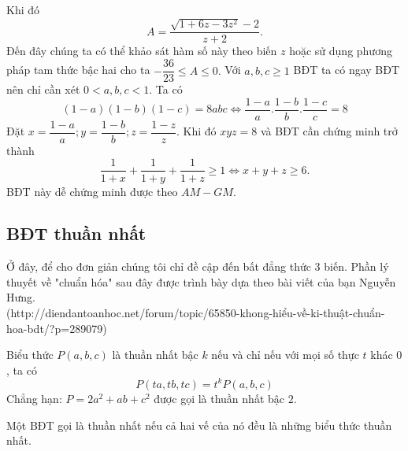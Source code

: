 Khi đó \[A=\frac{\sqrt{1+6z-3{{z}^{2}}}-2}{z+2}.\] Đến đây chúng ta có thể khảo sát hàm số này theo biến $z$ hoặc sử dụng phương pháp tam thức bậc hai cho ta $-\dfrac{36}{23}\le A\le 0.$
\hda  Với $a,b,c\ge 1$ BĐT ta có ngay BĐT nên chỉ cần xét $0<a,b,c<1$.
Ta có \[\left( 1-a \right)\left( 1-b \right)\left( 1-c \right)=8abc\Leftrightarrow \frac{1-a}{a}.\frac{1-b}{b}.\frac{1-c}{c}=8\]
Đặt $x=\dfrac{1-a}{a};y=\dfrac{1-b}{b};z=\dfrac{1-z}{z}$. Khi đó $xyz=8$ và BĐT cần chứng minh trở thành
\[\frac{1}{1+x}+\frac{1}{1+y}+\frac{1}{1+z}\ge 1\Leftrightarrow x+y+z\ge 6.\] BĐT này dễ chứng minh được theo $AM-GM$.
\subsection{BĐT thuần nhất}
Ở đây, để cho đơn giản chúng tôi chỉ đề cập đến bất đẳng thức 3 biến. Phần lý thuyết về "chuẩn hóa" sau đây được trình bày dựa theo bài viết của bạn Nguyễn Hưng.\\(http://diendantoanhoc.net/forum/topic/65850-khong-hiểu-về-ki-thuật-chuẩn-hoa-bdt/?p=289079)

Biểu thức $P(a,b,c)$ là thuần nhất bậc $k$ nếu và chỉ nếu với mọi số thực $t$ khác $0$, ta có
\[P\left( {ta,tb,tc} \right)={t^k}P\left( {a,b,c} \right)\]
Chẳng hạn: $P=2a^2+ab+c^2$ được gọi là thuần nhất bậc $2$.

Một BĐT gọi là thuần nhất nếu cả hai vế của nó đều là những biểu thức thuần nhất.

